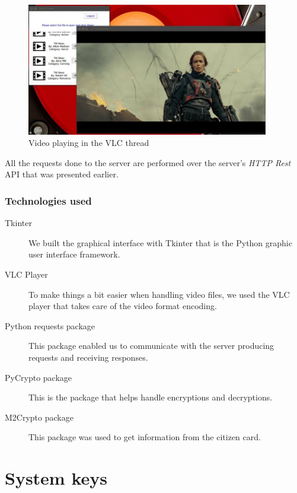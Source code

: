 \documentclass[11pt,a4paper]{report}
\begin{document}
\begin{figure}[H]
\centerline{\includegraphics[width=300pt]{images/playerPlay.jpg}}
\caption{Video playing in the VLC thread}
\label{player}
\end{figure}


All the requests done to the server are performed over the server's \emph{HTTP Rest} API that was presented earlier.

\subsection{Technologies used}
\begin{description}
  \item[Tkinter] We built the graphical interface with Tkinter that is the Python graphic user interface framework.
  \item[VLC Player] To make things a bit easier when handling video files, we used the VLC player that takes care of the video format encoding.
  \item[Python requests package] This package enabled us to communicate with the server producing requests and receiving responses.
  \item[PyCrypto package] This is the package that helps handle encryptions and decryptions.
  \item[M2Crypto package] This package was used to get information from the citizen card.
\end{description}

\chapter{System keys}
\end{document}
